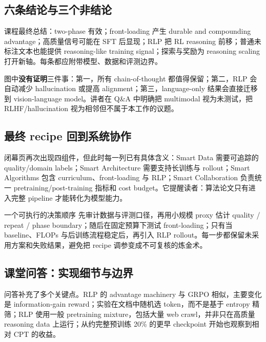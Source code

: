 \subsection{六条结论与三个非结论}

课程最终总结：two-phase 有效；front-loading 产生 durable and compounding advantage；高质量信号可能在 SFT 后显现；RLP 把 RL reasoning 前移；普通未标注文本也能提供 reasoning-like training signal；探索与奖励为 reasoning scaling 打开新轴。每条都应附带模型、数据和评测边界。


图中\textbf{没有证明}三件事：第一，所有 chain-of-thought 都值得保留；第二，RLP 会自动减少 hallucination 或提高 alignment；第三，language-only 结果会直接迁移到 vision-language model。讲者在 Q\&A 中明确把 multimodal 视为未测试，把 RLHF/hallucination 视为相邻但不属于本工作的议题。

\subsection{最终 recipe 回到系统协作}

闭幕页再次出现四组件，但此时每一列已有具体含义：Smart Data 需要可追踪的 quality/domain labels；Smart Architecture 需要支持长训练与 rollout；Smart Algorithms 包含 curriculum、front-loading 与 RLP；Smart Collaboration 负责统一 pretraining/post-training 指标和 cost budget。它提醒读者：算法论文只有进入完整 pipeline 才能转化为模型能力。


\begin{knowledgebox}{一个可执行的决策顺序}
先审计数据与评测口径，再用小规模 proxy 估计 quality / repeat / phase boundary；随后在固定预算下测试 front-loading；只有当 baseline、FLOPs 与后训练流程稳定后，再引入 RLP rollout。每一步都保留未采用方案和失败结果，避免把 recipe 调参变成不可复核的炼金术。
\end{knowledgebox}

\subsection{课堂问答：实现细节与边界}

问答补充了多个关键点。RLP 的 advantage machinery 与 GRPO 相似，主要变化是 information-gain reward；实验在文档中随机选 token，而不是基于 entropy 精筛；RLP 使用一般 pretraining mixture，包括大量 web crawl，并非只在高质量 reasoning data 上运行；从约完整预训练 20\% 的更早 checkpoint 开始也观察到相对 CPT 的收益。

